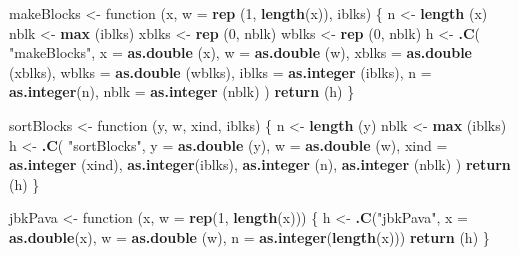 \documentclass[12pt,]{article}
\newenvironment{Shaded}{\begin{snugshade}}{\end{snugshade}}
\newcommand{\KeywordTok}[1]{\textcolor[rgb]{0.13,0.29,0.53}{\textbf{{#1}}}}
\newcommand{\DataTypeTok}[1]{\textcolor[rgb]{0.13,0.29,0.53}{{#1}}}
\newcommand{\DecValTok}[1]{\textcolor[rgb]{0.00,0.00,0.81}{{#1}}}
\newcommand{\StringTok}[1]{\textcolor[rgb]{0.31,0.60,0.02}{{#1}}}
\newcommand{\NormalTok}[1]{{#1}}
\begin{document}
\begin{Shaded}
\begin{Highlighting}[]
\NormalTok{makeBlocks <-}\StringTok{ }\NormalTok{function  (x, }\DataTypeTok{w =} \KeywordTok{rep} \NormalTok{(}\DecValTok{1}\NormalTok{, }\KeywordTok{length}\NormalTok{(x)), iblks) \{}
  \NormalTok{n <-}\StringTok{ }\KeywordTok{length} \NormalTok{(x)}
  \NormalTok{nblk <-}\StringTok{ }\KeywordTok{max} \NormalTok{(iblks)}
  \NormalTok{xblks <-}\StringTok{ }\KeywordTok{rep} \NormalTok{(}\DecValTok{0}\NormalTok{, nblk)}
  \NormalTok{wblks <-}\StringTok{ }\KeywordTok{rep} \NormalTok{(}\DecValTok{0}\NormalTok{, nblk)}
  \NormalTok{h <-}
\StringTok{    }\KeywordTok{.C}\NormalTok{(}
      \StringTok{"makeBlocks"}\NormalTok{,}
      \DataTypeTok{x =} \KeywordTok{as.double} \NormalTok{(x),}
      \DataTypeTok{w =} \KeywordTok{as.double} \NormalTok{(w),}
      \DataTypeTok{xblks =} \KeywordTok{as.double} \NormalTok{(xblks),}
      \DataTypeTok{wblks =} \KeywordTok{as.double} \NormalTok{(wblks),}
      \DataTypeTok{iblks =} \KeywordTok{as.integer} \NormalTok{(iblks),}
      \DataTypeTok{n =} \KeywordTok{as.integer}\NormalTok{(n),}
      \DataTypeTok{nblk =} \KeywordTok{as.integer} \NormalTok{(nblk)}
    \NormalTok{)}
  \KeywordTok{return} \NormalTok{(h)}
\NormalTok{\}}

\NormalTok{sortBlocks <-}\StringTok{ }\NormalTok{function (y, w, xind, iblks) \{}
  \NormalTok{n <-}\StringTok{ }\KeywordTok{length} \NormalTok{(y)}
  \NormalTok{nblk <-}\StringTok{ }\KeywordTok{max} \NormalTok{(iblks)}
  \NormalTok{h <-}\StringTok{ }\KeywordTok{.C}\NormalTok{(}
    \StringTok{"sortBlocks"}\NormalTok{,}
    \DataTypeTok{y =} \KeywordTok{as.double} \NormalTok{(y),}
    \DataTypeTok{w =} \KeywordTok{as.double} \NormalTok{(w),}
    \DataTypeTok{xind =} \KeywordTok{as.integer} \NormalTok{(xind),}
    \KeywordTok{as.integer}\NormalTok{(iblks),}
    \KeywordTok{as.integer} \NormalTok{(n),}
    \KeywordTok{as.integer} \NormalTok{(nblk)}
  \NormalTok{)}
  \KeywordTok{return} \NormalTok{(h)}
\NormalTok{\}}

\NormalTok{jbkPava <-}\StringTok{ }\NormalTok{function (x, }\DataTypeTok{w =} \KeywordTok{rep}\NormalTok{(}\DecValTok{1}\NormalTok{, }\KeywordTok{length}\NormalTok{(x))) \{}
  \NormalTok{h <-}
\StringTok{    }\KeywordTok{.C}\NormalTok{(}\StringTok{"jbkPava"}\NormalTok{,}
       \DataTypeTok{x =} \KeywordTok{as.double}\NormalTok{(x),}
       \DataTypeTok{w =} \KeywordTok{as.double} \NormalTok{(w),}
       \DataTypeTok{n =} \KeywordTok{as.integer}\NormalTok{(}\KeywordTok{length}\NormalTok{(x)))}
  \KeywordTok{return} \NormalTok{(h)}
\NormalTok{\}}


\end{Highlighting}
\end{Shaded}
\end{document}
